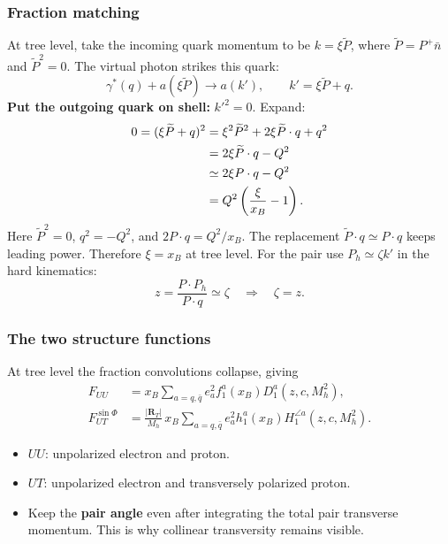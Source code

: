 \documentclass[14pt,a4paper]{extarticle}
\numberwithin{equation}{section}
\begin{document}
\subsubsection{Fraction matching}
At tree level, take the incoming quark momentum to be
$k=\xi\widetilde P$, where
$\widetilde P=P^+\bar n$ and $\widetilde P^2=0$.
The virtual photon strikes this quark:
\begin{equation}
 \gamma^*(q)+a(\xi\widetilde P)\longrightarrow a(k'),
 \qquad k'=\xi\widetilde P+q.
\end{equation}
\textbf{Put the outgoing quark on shell:} $k'^2=0$. Expand:
\begin{align}
 0=(\xi\widetilde P+q)^2
 &=\xi^2\widetilde P^2+2\xi\widetilde P\cdot q+q^2\notag\\
 &=2\xi\widetilde P\cdot q-Q^2\notag\\
 &\simeq 2\xi P\cdot q-Q^2\notag\\
 &=Q^2\left(\frac{\xi}{x_B}-1\right).
\end{align}
Here $\widetilde P^2=0$, $q^2=-Q^2$, and
$2P\cdot q=Q^2/x_B$. The replacement
$\widetilde P\cdot q\simeq P\cdot q$ keeps leading power.
Therefore $\boxed{\xi=x_B}$ at tree level.
For the pair use $P_h\simeq\zeta k'$ in the hard kinematics:
\begin{equation}
 z=\frac{P\cdot P_h}{P\cdot q}\simeq\zeta
 \quad\Rightarrow\quad\zeta=z.
\end{equation}


\subsubsection{The two structure functions}

At tree level the fraction convolutions collapse, giving
\begin{align}
 F_{UU}&=x_B\sum_{a=q,\bar q}e_a^2 f_1^a(x_B)D_1^a(z,c,M_h^2),\\
 F_{UT}^{\sin\Phi}
 &=\boxed{\frac{|\bm R_T|}{M_h}\,x_B
 \sum_{a=q,\bar q}e_a^2 h_1^a(x_B)H_1^{\angle a}(z,c,M_h^2)}.
 \label{eq:dihadron-structure}
\end{align}
\begin{itemize}
 \item $UU$: unpolarized electron and proton.
 \item $UT$: unpolarized electron and transversely polarized proton.
 \item Keep the \textbf{pair angle} even after integrating the total pair
 transverse momentum. This is why collinear transversity remains visible.
\end{itemize}
\end{document}
